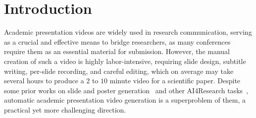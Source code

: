 
\vspace{-1\baselineskip} 
\section{Introduction}
\vspace{-0.3\baselineskip} 



Academic presentation videos are widely used in research communication, serving as a crucial and effective means to bridge researchers, as many conferences require them as an essential material for submission. However, the manual creation of such a video is highly labor-intensive, requiring slide design, subtitle writing, per-slide recording, and careful editing, which on average may take several hours to produce a $2$ to $10$ minute video for a scientific paper. Despite some prior works on slide and poster generation~\cite{sun2021d2s,zheng2025pptagent,pang2025paper2poster} and other AI4Research tasks~\cite{ai4research,writing_ass,goldsack2022making,paper2code,paper2agent}, automatic academic presentation video generation is a superproblem of them, a practical yet more challenging direction. 

